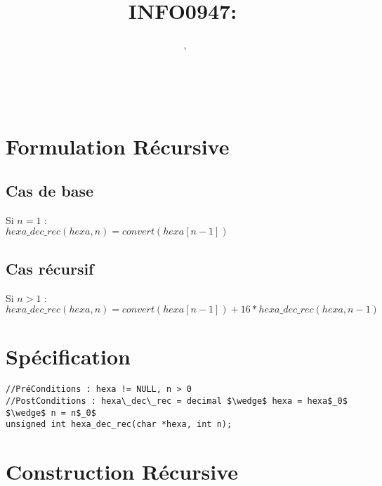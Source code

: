 \documentclass[a4paper, 11pt, oneside]{article}
\title{INFO0947: \intitule}
\author{\textsc{\Prenom}~\textsc{\Nom}, \matricule}
\date{}
\newcommand{\tablemat}{~}
\begin{document}
\maketitle
\newpage
\tablemat
\newpage


\section{Formulation Récursive}\label{formulation}
%
%

\subsection{Cas de base}

Si $n = 1$ :\\

$hexa\_dec\_rec(hexa, n) = convert(hexa[n - 1])$\\

\subsection{Cas récursif}

Si $n > 1$ :\\

$hexa\_dec\_rec(hexa, n) = convert(hexa[n - 1]) + 16 * hexa\_dec\_rec(hexa, n - 1)$\\

\section{Spécification}\label{specification}
%
%

\begin{lstlisting}
//PréConditions : hexa != NULL, n > 0
//PostConditions : hexa\_dec\_rec = decimal $\wedge$ hexa = hexa$_0$ $\wedge$ n = n$_0$
unsigned int hexa_dec_rec(char *hexa, int n);
\end{lstlisting}

\section{Construction Récursive}\label{recur}
%
%
\end{document}
